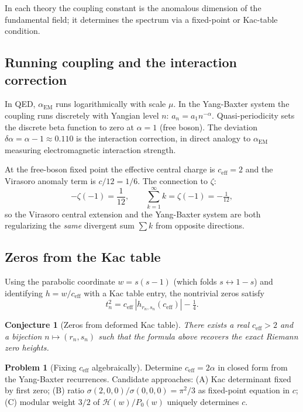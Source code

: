\documentclass[%
 aip,
 amsmath,amssymb,
 reprint,%
]{revtex4-1}
\theoremstyle{plain}
\newtheorem{conjecture}{Conjecture}[section]
\theoremstyle{definition}
\newtheorem{problem}[theorem]{Problem}
\begin{document}
In each theory the coupling constant is the anomalous dimension of the
fundamental field; it determines the spectrum via a fixed-point or Kac-table
condition.

\subsection{Running coupling and the interaction correction}

In QED, $\alpha_{\mathrm{EM}}$ runs logarithmically with scale $\mu$.
In the Yang-Baxter system the coupling runs discretely with Yangian level $n$:
$a_n = a_1 n^{-\alpha}$. Quasi-periodicity sets the discrete beta function to
zero at $\alpha = 1$ (free boson). The deviation
$\delta\alpha = \alpha - 1 \approx 0.110$ is the interaction correction,
in direct analogy to $\alpha_{\mathrm{EM}}$ measuring electromagnetic
interaction strength.

At the free-boson fixed point the effective central charge is $c_{\mathrm{eff}} = 2$
and the Virasoro anomaly term is $c/12 = 1/6$. The connection to $\zeta$:
\[
-\zeta(-1) = \frac{1}{12}, \qquad
\sum_{k=1}^\infty k = \zeta(-1) = -\tfrac{1}{12},
\]
so the Virasoro central extension and the Yang-Baxter system are both regularizing
the \emph{same} divergent sum $\sum k$ from opposite directions.

\subsection{Zeros from the Kac table}

Using the parabolic coordinate $w = s(s-1)$ (which folds $s \leftrightarrow 1-s$)
and identifying $h = w/c_{\mathrm{eff}}$ with a Kac table entry, the nontrivial
zeros satisfy
\[
t_n^2 = c_{\mathrm{eff}}\,|h_{r_n, s_n}(c_{\mathrm{eff}})| - \tfrac{1}{4}.
\]

\begin{conjecture}[Zeros from deformed Kac table]\label{conj:kac_zeros}
There exists a real $c_{\mathrm{eff}} > 2$ and a bijection $n \mapsto (r_n, s_n)$
such that the formula above recovers the exact Riemann zero heights.
\end{conjecture}

\begin{problem}[Fixing $c_{\mathrm{eff}}$ algebraically]\label{prob:ceff}
Determine $c_{\mathrm{eff}}  = 2\alpha$ in closed form from the Yang-Baxter
recurrences. Candidate approaches: (A) Kac determinant fixed by first zero; (B)
ratio $\sigma(2,0,0)/\sigma(0,0,0) = \pi^2/3$ as fixed-point equation in $c$;
(C) modular weight $3/2$ of $\mathcal{H}(w)/P_0(w)$ uniquely determines $c$.
\end{problem}
\end{document}
